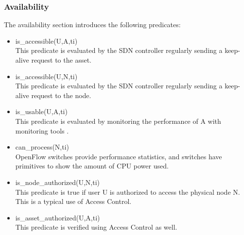 \subsubsection{Availability}
The availability section introduces the following predicates:
\begin{itemize}
\item is\_accessible(U,A,ti)
\\ This predicate is evaluated by the SDN controller regularly sending a keep-alive request to the asset.

\item is\_accessible(U,N,ti)
\\ This predicate is evaluated by the SDN controller regularly sending a keep-alive request to the node.


\item is\_usable(U,A,ti)
\\This predicate is evaluated by monitoring the performance of A with monitoring tools .


\item can\_process(N,ti)
\\ OpenFlow switches provide performance statistics, and switches have primitives to show the amount of CPU power used.

\item is\_node\_authorized(U,N,ti)\\
This predicate is true if user U is authorized to access the physical node N.
This is a typical use of Access Control.

\item is\_asset\_authorized(U,A,ti)\\
This predicate is verified using Access Control as well.
\end{itemize}


 
